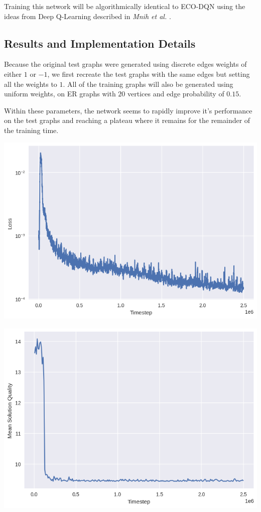 \documentclass{article}
\begin{document}
Training this network will be algorithmically identical to ECO-DQN \cite{eco-dqn} using the ideas from Deep Q-Learning described in \textit{Mnih et al.} \cite{deepmind_2015}.

\subsection{Results and Implementation Details}

Because the original test graphs were generated using discrete edges weights of either $1$ or $-1$, we first recreate the test graphs with the same edges but setting all the weights to $1$. All of the training graphs will also be generated using uniform weights, on ER graphs with $20$ vertices and edge probability of $0.15$.

Within these parameters, the network seems to rapidly improve it's performance on the test graphs and reaching a plateau where it remains for the remainder of the training time.

\includegraphics[scale=0.5]{../ER_20spin/eco/min_cover/network/loss.png}

\includegraphics[scale=0.5]{../ER_20spin/eco/min_cover/network/training_curve.png}
\end{document}
